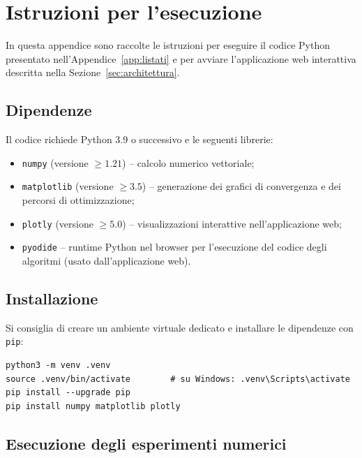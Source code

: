 \section{Istruzioni per l'esecuzione}\label{app:istruzioni}

In questa appendice sono raccolte le istruzioni per eseguire il codice
Python presentato nell'Appendice~\ref{app:listati} e per avviare
l'applicazione web interattiva descritta nella Sezione~\ref{sec:architettura}.

\subsection{Dipendenze}

Il codice richiede Python 3.9 o successivo e le seguenti librerie:

\begin{itemize}
  \item \texttt{numpy} (versione $\geq 1.21$) -- calcolo numerico vettoriale;
  \item \texttt{matplotlib} (versione $\geq 3.5$) -- generazione dei grafici
  di convergenza e dei percorsi di ottimizzazione;
  \item \texttt{plotly} (versione $\geq 5.0$) -- visualizzazioni interattive
  nell'applicazione web;
  \item \texttt{pyodide} -- runtime Python nel browser per l'esecuzione del
  codice degli algoritmi (usato dall'applicazione web).
\end{itemize}

\subsection{Installazione}

Si consiglia di creare un ambiente virtuale dedicato e installare le
dipendenze con \texttt{pip}:

\begin{verbatim}
python3 -m venv .venv
source .venv/bin/activate        # su Windows: .venv\Scripts\activate
pip install --upgrade pip
pip install numpy matplotlib plotly
\end{verbatim}

\subsection{Esecuzione degli esperimenti numerici}

